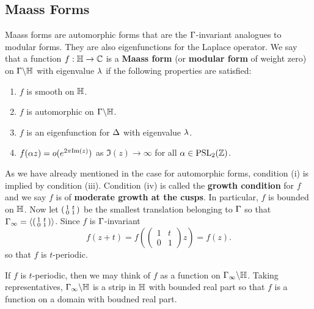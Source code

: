     \subsection*{Maass Forms}
      Maass forms are automorphic forms that are the $\Gamma$-invariant analogues to modular forms. They are also eigenfunctions for the Laplace operator. We say that a function $f:\mathbb{H} \to \mathbb{C}$ is a \textbf{Maass form} (or \textbf{modular form} of weight zero) on $\Gamma\backslash\mathbb{H}$ with eigenvalue $\lambda$ if the following properties are satisfied:
      \begin{enumerate}[label=(\roman*)]
        \item $f$ is smooth on $\mathbb{H}$.
        \item $f$ is automorphic on $\Gamma\backslash\mathbb{H}$.
        \item $f$ is an eigenfunction for $\Delta$ with eigenvalue $\lambda$.
        \item $f(\alpha z) = o(e^{2\pi\mathrm{Im}(z)})$ as $\Im(z) \to \infty$ for all $\alpha \in \mathrm{PSL}_{2}(\mathbb{Z})$.
      \end{enumerate}
      As we have already mentioned in the case for automorphic forms, condition (i) is implied by condition (iii). Condition (iv) is called the \textbf{growth condition} for $f$ and we say $f$ is of \textbf{moderate growth at the cusps}. In particular, $f$ is bounded on $\mathbb{H}$. Now let $\begin{psmallmatrix} 1 & t \\ 0 & 1 \end{psmallmatrix}$ be the smallest translation belonging to $\Gamma$ so that $\Gamma_{\infty} = \left\langle\begin{psmallmatrix} 1 & t \\ 0 & 1 \end{psmallmatrix}\right\rangle$. Since $f$ is $\Gamma$-invariant
      \[
        f(z+t) = f\left(\begin{pmatrix} 1 & t \\ 0 & 1 \end{pmatrix}z\right) = f(z).
      \]
      so that $f$ is $t$-periodic.

      \begin{remark}
        If $f$ is $t$-periodic, then we may think of $f$ as a function on $\Gamma_{\infty}\backslash\mathbb{H}$. Taking representatives, $\Gamma_{\infty}\backslash\mathbb{H}$ is a strip in $\mathbb{H}$ with bounded real part so that $f$ is a function on a domain with boudned real part.
      \end{remark}

